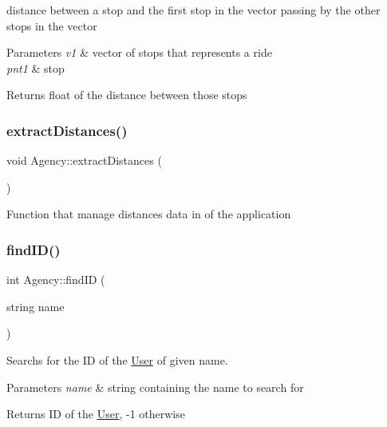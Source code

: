 distance between a stop and the first stop in the vector passing by the other stops in the vector 


\begin{DoxyParams}{Parameters}
{\em v1} & vector of stops that represents a ride \\
\hline
{\em pnt1} & stop \\
\hline
\end{DoxyParams}
\begin{DoxyReturn}{Returns}
float of the distance between those stops 
\end{DoxyReturn}
\mbox{\label{class_agency_ab893f05c69379631019010af71052595}} 
\subsubsection{\texorpdfstring{extract\+Distances()}{extractDistances()}}
{\footnotesize\ttfamily void Agency\+::extract\+Distances (\begin{DoxyParamCaption}{ }\end{DoxyParamCaption})}

Function that manage distances data in of the application \mbox{\label{class_agency_ab129c30ae0ba6c735d0f600c1b00894d}} 
\subsubsection{\texorpdfstring{find\+I\+D()}{findID()}}
{\footnotesize\ttfamily int Agency\+::find\+ID (\begin{DoxyParamCaption}\item[{string}]{name }\end{DoxyParamCaption})}



Searchs for the ID of the \hyperlink{class_user}{User} of given name. 


\begin{DoxyParams}{Parameters}
{\em name} & string containing the name to search for\\
\hline
\end{DoxyParams}
\begin{DoxyReturn}{Returns}
ID of the \hyperlink{class_user}{User}, -\/1 otherwise 
\end{DoxyReturn}
\mbox{\label{class_agency_a6e06b2cf396c6d41ed4d5e2f215a3035}} 

